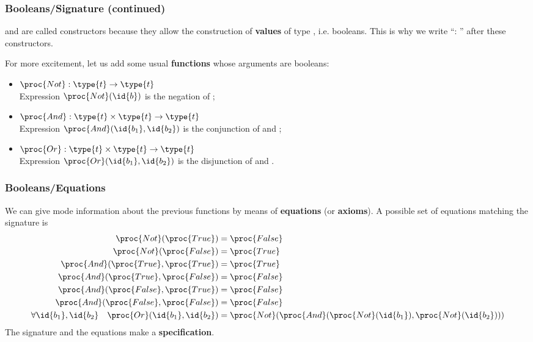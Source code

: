 %
\begin{frame}
\frametitle{Booleans/Signature (continued)}

 and  are called constructors because they
allow the construction of \textbf{values} of type ,
i.e. booleans. This is why we write ``: '' after these
constructors.

\bigskip

For more excitement, let us add some usual \textbf{functions} whose
arguments are booleans:
\begin{itemize}

  \item \(\proc{Not} : \type{t} \rightarrow \type{t}\)\\ Expression
    \(\proc{Not} (\id{b})\) is the negation of ;

  \item \(\proc{And} : \type{t} \times \type{t} \rightarrow
    \type{t}\)\\ Expression \(\proc{And} (\id{b_1}, \id{b_2})\) is
    the conjunction of  and ;

  \item \(\proc{Or} : \type{t} \times \type{t} \rightarrow
    \type{t}\)\\ Expression \(\proc{Or} (\id{b_1}, \id{b_2})\) is
    the disjunction of  and .

\end{itemize}

\end{frame}

%
\begin{frame}
\frametitle{Booleans/Equations}

We can give mode information about the previous functions by means of
\textbf{equations} (or \textbf{axioms}). A possible set of equations
matching the signature is
\begin{align*}
\proc{Not} (\proc{True}) &= \proc{False}\\
\proc{Not} (\proc{False}) &= \proc{True}\\
\proc{And} (\proc{True}, \proc{True}) &= \proc{True}\\
\proc{And} (\proc{True}, \proc{False}) &= \proc{False}\\
\proc{And} (\proc{False}, \proc{True}) &= \proc{False}\\
\proc{And} (\proc{False}, \proc{False}) &= \proc{False}\\
   \forall \id{b_1}, \id{b_2} \quad \proc{Or} (\id{b_1}, \id{b_2}) 
&= \proc{Not} (\proc{And} (\proc{Not} (\id{b_1}), \proc{Not} (\id{b_2})))
\end{align*}
The signature and the equations make a \textbf{specification}.

\end{frame}

